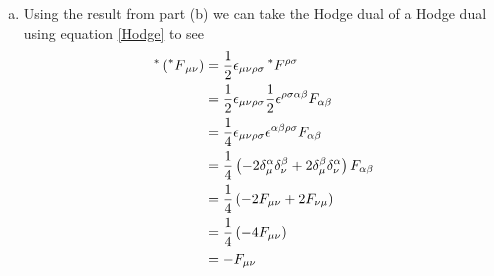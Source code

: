 \documentclass[11pt]{article}
\numberwithin{equation}{section}
\begin{document}
\begin{enumerate}[(a)]
\item
    Using the result from part (b) we can take the Hodge dual of a Hodge dual using equation \ref{Hodge} to see
    \begin{align*}
        ^*\left(\prescript{*}{}{F}_{\mu\nu}\right) &= \frac{1}{2}\epsilon_{\mu\nu\rho\sigma}\prescript{*}{}{F}^{\rho\sigma}\\
                                                   &= \frac{1}{2}\epsilon_{\mu\nu\rho\sigma}\frac{1}{2}\epsilon^{\rho\sigma\alpha\beta}F_{\alpha\beta}\\
                                                   &= \frac{1}{4}\epsilon_{\mu\nu\rho\sigma}\epsilon^{\alpha\beta\rho\sigma}F_{\alpha\beta}\\
                                                   &= \frac{1}{4}\left(-2\delta_{\mu}^{\alpha}\delta_{\nu}^{\beta} +2\delta_{\mu}^{\beta}\delta_{\nu}^{\alpha}\right)F_{\alpha\beta}\\
                                                   &= \frac{1}{4}\left(-2F_{\mu\nu}+2F_{\nu\mu}\right)\\
                                                   &= \frac{1}{4}\left(-4F_{\mu\nu}\right)\\
                                                   &= -F_{\mu\nu}
    \end{align*}
\end{enumerate}
\end{document}
